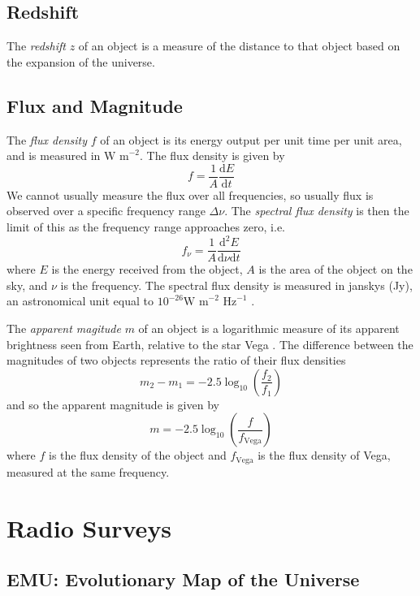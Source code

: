         \subsection{Redshift}

            The \emph{redshift} $z$ of an object is a measure of the distance to that object based on the expansion of the universe. 

        \subsection{Flux and Magnitude}

            The \emph{flux density} $f$ of an object is its energy output per unit time per unit area, and is measured in $\text{W m}^{-2}$. The flux density is given by
            \[
                f = \frac{1}{A}\frac{\text{d}E}{\text{d}t}
            \]
            We cannot usually measure the flux over all frequencies, so usually flux is observed over a specific frequency range $\Delta \nu$. The \emph{spectral flux density} is then the limit of this as the frequency range approaches zero, i.e.
            \[
                f_\nu = \frac{1}{A}\frac{\text{d}^2E}{\text{d}\nu\text{d}t}
            \]
            where $E$ is the energy received from the object, $A$ is the area of the object on the sky, and $\nu$ is the frequency. The spectral flux density is measured in janskys (Jy), an astronomical unit equal to $10^{-26} \text{W m}^{-2} \text{ Hz}^{-1}$ \citep{francis08}.

            The \emph{apparent magitude} $m$ of an object is a logarithmic measure of its apparent brightness seen from Earth, relative to the star Vega \citep{francis08}. The difference between the magnitudes of two objects represents the ratio of their flux densities
            \[
                m_2 - m_1 = -2.5 \log_{10} \left(\frac{f_2}{f_1}\right)
            \]
            and so the apparent magnitude is given by
            \[
                m = -2.5 \log_{10} \left(\frac{f}{f_{\text{Vega}}}\right)
            \]
            where $f$ is the flux density of the object and $f_{\text{Vega}}$ is the flux density of Vega, measured at the same frequency.

    \section{Radio Surveys}
    \label{sec:radio-surveys}

        \subsection{EMU: Evolutionary Map of the Universe}
        \label{sec:emu}

